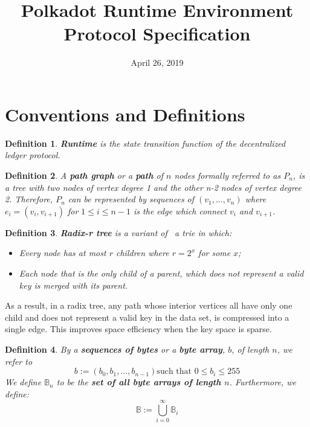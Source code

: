 \documentclass{article}
\newcommand{\assign}{:=}
\newcommand{\tmstrong}[1]{\textbf{#1}}
\newcommand{\tmtextbf}[1]{{\bfseries{#1}}}
\newcommand{\tmtexttt}[1]{{\ttfamily{#1}}}
\newcommand{\tmverbatim}[1]{{\ttfamily{#1}}}
\newtheorem{definition}{Definition}
\providecommand{\tmstrong}[1]{\tmtextbf{#1}}
\providecommand{\tmtextbf}[1]{\tmtextbf{#1}}
\providecommand{\tmverbatim}[1]{\tmtexttt{#1}}
\newtheorem{definition}{Definition}
\begin{document}
\title{
  Polkadot Runtime Environment\\
  {\Large Protocol Specification}
}

\date{April 26, 2019}

\maketitle

\section{Conventions and Definitions}

\begin{definition}
  {\tmstrong{Runtime}} is the state transition function of the decentralized
  ledger protocol.\tmverbatim{}
\end{definition}

\begin{definition}
  \label{def-path-graph}A {\tmstrong{path graph}} or a {\tmstrong{path}} of
  $n$ nodes formally referred to as {\tmstrong{$P_n$}}, is a tree with two
  nodes of vertex degree 1 and the other n-2 nodes of vertex degree 2.
  Therefore, $P_n$ can be represented by sequences of $(v_1, \ldots, v_n)$
  where $e_i = (v_i, v_{i + 1})$ for $1 \leqslant i \leqslant n - 1$ is the
  edge which connect $v_i$ and $v_{i + 1}$.
\end{definition}

\begin{definition}
  \label{defn-radix-tree}{\tmstrong{Radix-r tree}} is a variant of \ a trie in
  which:
  \begin{itemize}
    \item Every node has at most $r$ children where $r = 2^x$ for some $x$;
    
    \item Each node that is the only child of a parent, which does not
    represent a valid key is merged with its parent.
  \end{itemize}
\end{definition}

As a result, in a radix tree, any path whose interior vertices all have only
one child and does not represent a valid key in the data set, is compressed
into a single edge. This improves space efficiency when the key space is
sparse.

\begin{definition}
  By a {\tmstrong{sequences of bytes}} or a {\tmstrong{byte array}}, $b$, of
  length $n$, we refer to
  \[ b \assign (b_0, b_1, ..., b_{n - 1})  \text{such that } 0 \leqslant b_i
     \leqslant 255 \]
  We define $\mathbb{B}_n$ to be the {\tmstrong{set of all byte arrays of
  length $n$}}. Furthermore, we define:
  \[ \mathbb{B} \assign \bigcup^{\infty}_{i = 0} \mathbb{B}_i \]
\end{definition}
\end{document}
